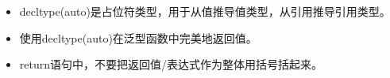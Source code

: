 \begin{itemize}
	\item decltype(auto)是占位符类型，用于从值推导值类型，从引用推导引用类型。
	\item 使用decltype(auto)在泛型函数中完美地返回值。
	\item return语句中，不要把返回值/表达式作为整体用括号括起来。
\end{itemize}


\newpage